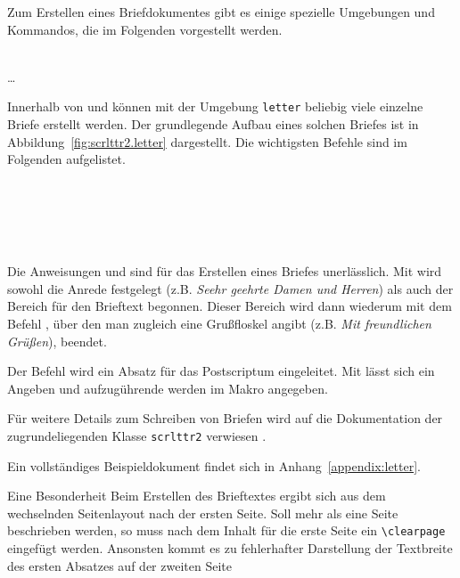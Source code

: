Zum Erstellen eines Briefdokumentes gibt es einige spezielle Umgebungen und
Kommandos, die im Folgenden vorgestellt werden.

\begin{Declaration}
  \\
  \quad\dots\\
\end{Declaration}

Innerhalb von \lstinline!! und \lstinline!!
können mit der Umgebung \lstinline{letter} beliebig viele einzelne Briefe
erstellt werden. Der grundlegende Aufbau eines solchen Briefes ist in
Abbildung~\ref{fig:scrlttr2.letter} dargestellt. Die wichtigsten Befehle
sind im Folgenden aufgelistet.

\begin{Declaration}
  \\
  \\
  \\
  \\
\end{Declaration}

Die Anweisungen  und  sind für das Erstellen
eines Briefes unerlässlich. Mit  wird sowohl die Anrede
festgelegt (z.B. \textit{Seehr geehrte Damen und Herren}) als auch der
Bereich für den Brieftext begonnen.
Dieser Bereich wird dann wiederum mit dem Befehl , über den
man zugleich eine Grußfloskel angibt (z.B. \textit{Mit freundlichen Grüßen}),
beendet.

Der Befehl  wird ein Absatz für das Postscriptum eingeleitet.
Mit  lässt sich ein  Angeben und
aufzugührende  werden im Makro  angegeben.

Für weitere Details zum Schreiben von Briefen wird auf die Dokumentation
der zugrundeliegenden Klasse \lstinline{scrlttr2} verwiesen
\cite[S.162ff]{koma-skript}.

Ein vollständiges Beispieldokument findet sich in Anhang~\ref{appendix:letter}.

\begin{important}
Eine Besonderheit Beim Erstellen des Brieftextes ergibt sich aus dem wechselnden
Seitenlayout nach der ersten Seite.
Soll mehr als eine Seite beschrieben werden, so muss nach
dem Inhalt für die erste Seite ein \lstinline{\clearpage} eingefügt werden.
Ansonsten kommt es zu fehlerhafter Darstellung der Textbreite des ersten
Absatzes auf der zweiten Seite
\end{important}


